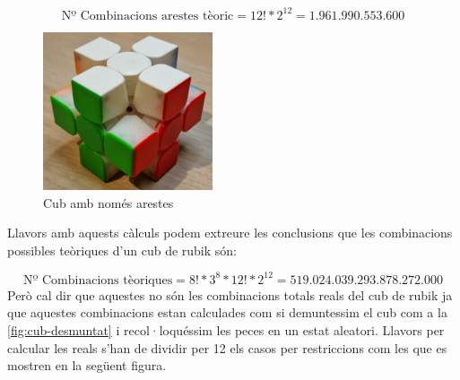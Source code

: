 $$ \textrm{Nº Combinacions arestes tèoric} = 12!*2^12 = 1.961.990.553.600$$

\begin{figure}[h!]
    \centering
    \includegraphics[width=5cm]{img/figures/only-edges.jpg}
    \caption{Cub amb només arestes}
    \label{fig:only-edges}
\end{figure} 

Llavors amb aquests càlculs podem extreure les conclusions que les combinacions possibles teòriques d'un cub de rubik són:

$$ \textrm{Nº Combinacions tèoriques} = 8!*3^8*12!*2^{12}= 519.024.039.293.878.272.000 $$
Però cal dir que aquestes no són les combinacions totals reals del cub de rubik ja que aquestes combinacions estan calculades com si demuntessim el cub com a la \ref{fig:cub-desmuntat} i recol·loquéssim les peces en un estat aleatori.
Llavors per calcular les reals s'han de dividir per 12 els casos per restriccions com les que es mostren en la següent figura.

